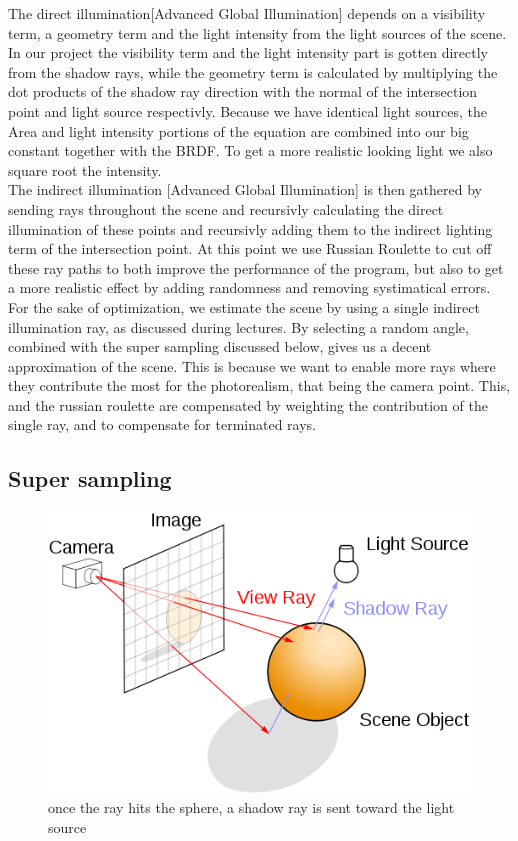 \documentclass[12pt]{article}
\numberwithin{equation}{section}
\begin{document}
The direct illumination[Advanced Global Illumination] depends on a visibility term, a geometry term and the light intensity from the light sources of the scene. In our project the visibility term and the light intensity part is gotten directly from the shadow rays, while the geometry term is calculated by multiplying the dot products of the shadow ray direction with the normal of the intersection point and light source respectivly. Because we have identical light sources, the Area and light intensity portions of the equation are combined into our big constant together with the BRDF. To get a more realistic looking light we also square root the intensity.\\

The indirect illumination [Advanced Global Illumination] is then gathered by sending rays throughout the scene and recursivly calculating the direct illumination of these points and recursivly adding them to the indirect lighting term of the intersection point. At this point we use Russian Roulette to cut off these ray paths to both improve the performance of the program, but also to get a more realistic effect by adding randomness and removing systimatical errors.\\

For the sake of optimization, we estimate the scene by using a single indirect illumination ray, as discussed during lectures. By selecting a random angle, combined with the super sampling discussed below, gives us a decent approximation of the scene. This is because we want to enable more rays where they contribute the most for the photorealism, that being the camera point. This, and the russian roulette are compensated by weighting the contribution of the single ray, and to compensate for terminated rays.

\subsection{Super sampling}

\begin{figure}
  \begin{center}
    \includegraphics[scale=0.5]{500px-Ray_trace_diagram.png}
    \caption{once the ray hits the sphere, a shadow ray is sent toward the light source}
    \label{fig:4}
  \end{center}
\end{figure}
\end{document}
